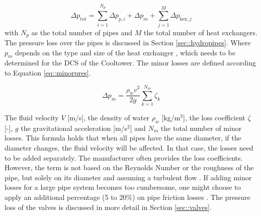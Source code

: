 \begin{equation}
    \Delta p_{\text{tot}} = \sum^{N_p}_{i=1} \Delta p_{p,i} + \Delta p_m + \sum^{M}_{j=1} \Delta p_{\text{hex},j} 
\end{equation}
with $N_p$ as the total number of pipes and $M$ the total number of heat exchangers. The pressure loss over the pipes is discussed in Section \ref{sec::hydropipes}. Where $p_m$ depends on the type and size of the heat exchanger \cite{YvoPutter}, which needs to be determined for the DCS of the Cooltower. The minor losses are defined according to Equation \ref{eq::minorpres}.

\begin{equation}\label{eq::minorpres}
    \Delta p_m = \frac{\rho_w v^2}{2g} \sum^{N_m}_{k=1} \zeta_k
\end{equation}

The fluid velocity $V$ [m/s], the density of water $\rho_w$ [kg/m$^3$], the loss coefficient $\zeta$ [-], $g$ the gravitational acceleration [m/s$^2$] and $N_m$ the total number of minor losses. This formula holds that when all pipes have the same diameter, if the diameter changes, the fluid velocity will be affected. In that case, the losses need to be added separately. The manufacturer often provides the loss coefficients. However, the term is not based on the Reynolds Number or the roughness of the pipe, but solely on its diameter and assuming a turbulent flow \cite{white2011fluid}. If adding minor losses for a large pipe system becomes too cumbersome, one might choose to apply an additional percentage (5 to 20\%) on pipe friction losses \cite{echtephdthesis}. The pressure loss of the valves is discussed in more detail in Section \ref{sec::valves}.



